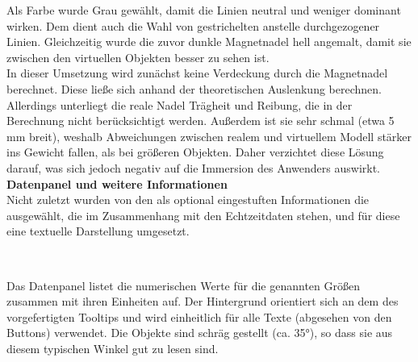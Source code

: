 Als Farbe wurde Grau gewählt, damit die Linien neutral und weniger dominant wirken. Dem dient auch die Wahl von gestrichelten anstelle durchgezogener Linien. Gleichzeitig wurde die zuvor dunkle Magnetnadel hell angemalt, damit sie zwischen den virtuellen Objekten besser zu sehen ist.\\

In dieser Umsetzung wird zunächst keine Verdeckung durch die Magnetnadel berechnet. Diese ließe sich anhand der theoretischen Auslenkung berechnen. Allerdings unterliegt die reale Nadel Trägheit und Reibung, die in der Berechnung nicht berücksichtigt werden. Außerdem ist sie sehr schmal (etwa 5 mm breit), weshalb Abweichungen zwischen realem und virtuellem Modell stärker ins Gewicht fallen, als bei größeren Objekten. Daher verzichtet diese Lösung darauf, was sich jedoch negativ auf die Immersion des Anwenders auswirkt.\\

\textbf{Datenpanel und weitere Informationen}\\
Nicht zuletzt wurden von den als optional eingestuften Informationen die ausgewählt, die im Zusammenhang mit den Echtzeitdaten stehen, und für diese eine textuelle Darstellung umgesetzt.
\vspace{4px}
\begin{center}
	\\
\end{center}
\vspace{6px}
Das Datenpanel listet die numerischen Werte für die genannten Größen zusammen mit ihren Einheiten auf. Der Hintergrund orientiert sich an dem des vorgefertigten Tooltips und wird einheitlich für alle Texte (abgesehen von den Buttons) verwendet. Die Objekte sind schräg gestellt (ca. 35°), so dass sie aus diesem typischen Winkel gut zu lesen sind.\\

